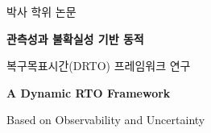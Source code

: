 
\thispagestyle{empty}

\begingroup
\setlength{\parskip}{0pt}
\setlength{\parindent}{0pt}

\vspace*{0.5cm}
{\fontsize{14}{20}\selectfont 박사 학위 논문}

\vspace*{3.0cm}

\begin{center}
  \begin{minipage}{13cm}  %
    \centering
    {\fontsize{18}{18}\selectfont\bfseries
    관측성과 불확실성 기반 동적\par
    복구목표시간(DRTO) 프레임워크 연구\par}
  \end{minipage}
\end{center}

\vspace*{1.0cm}

\begin{center}
  \begin{minipage}{13cm}
    \centering
    {\fontsize{18}{18}\selectfont\bfseries
      A Dynamic RTO Framework\par
      Based on Observability and Uncertainty\par}
  \end{minipage}
\end{center}


\vspace*{3.0cm}

